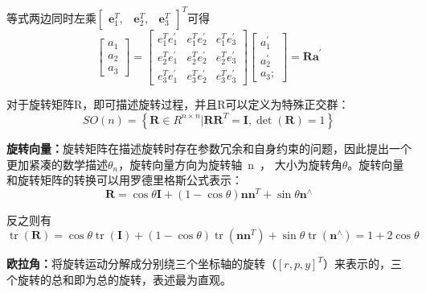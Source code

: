 等式两边同时左乘$\left[\begin{array}{ccc}{\mathbf{e}_{1}^{T},} & {\mathbf{e}_{2}^{T},} & {\mathbf{e}_{3}^{T}}\end{array}\right]^{T}$可得
\begin{equation}
\left[\begin{array}{l}{a_{1}} \\ {a_{2}} \\ {a_{3}}\end{array}\right]=\left[\begin{array}{lll}{e_{1}^{T} e_{1}^{\prime}} & {e_{1}^{T} e_{2}^{\prime}} & {e_{1}^{T} e_{3}^{\prime}} \\ {e_{2}^{T} e_{1}^{\prime}} & {e_{2}^{T} e_{2}^{\prime}} & {e_{2}^{T} e_{3}^{\prime}} \\ {e_{3}^{T} e_{1}^{\prime}} & {e_{3}^{T} e_{2}^{\prime}} & {e_{3}^{T} e_{3}^{\prime}}\end{array}\right]\left[\begin{array}{c}{a_{1}^{\prime}} \\ {a_{2}^{\prime}} \\ {a_{3} ;}\end{array}\right]=\mathbf{R a}^{\prime}
\end{equation}

对于旋转矩阵R，即可描述旋转过程，并且R可以定义为特殊正交群：
\begin{equation}
  S O(n)=\left\{\mathbf{R} \in R^{n \times n} | \mathbf{R} \mathbf{R}^{T}=\mathbf{I}, \operatorname{det}(\mathbf{R})=1\right\}
\end{equation}

\textbf{旋转向量：}旋转矩阵在描述旋转时存在参数冗余和自身约束的问题，因此提出一个更加紧凑的数学描述$\theta_{n}$，旋转向量方向为旋转轴{~n~}，
大小为旋转角$\theta$。旋转向量和旋转矩阵的转换可以用罗德里格斯公式表示：
\begin{equation}
  \mathbf{R}=\cos \theta \mathbf{I}+(1-\cos \theta) \mathbf{n} \mathbf{n}^{T}+\sin \theta \mathbf{n}^{\wedge}
\end{equation}

反之则有
\begin{equation}
  \operatorname{tr}(\mathbf{R})=\cos \theta \operatorname{tr}(\mathbf{I})+(1-\cos \theta) \operatorname{tr}\left(\mathbf{n} \mathbf{n}^{T}\right)+\sin \theta \operatorname{tr}\left(\mathbf{n}^{\wedge}\right)=1+2 \cos \theta
\end{equation}

\textbf{欧拉角：}将旋转运动分解成分别绕三个坐标轴的旋转（$[r, p, y]^{T}$）来表示的，三个旋转的总和即为总的旋转，表述最为直观。

